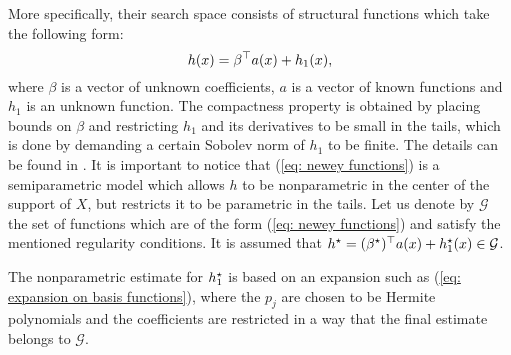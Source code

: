 More specifically, their search space consists of structural functions which take the following form:
\begin{equation}
    \label{eq: newey functions}
    h ( x ) = \beta^{ \top } a ( x ) + h_{ 1 } ( x )
,\end{equation}
where $ \beta $ is a vector of unknown coefficients, $ a $ is a vector of known functions and $ h_{ 1 } $ is an unknown function.
The compactness property is obtained by placing bounds on $ \beta $ and restricting $ h_{ 1 } $ and its derivatives to be small in the tails, which is done by demanding a certain Sobolev norm of $ h_{ 1 } $ to be finite.
The details can be found in \cite{newey2003}.
It is important to notice that (\ref{eq: newey functions}) is a semiparametric model which allows $ h $ to be nonparametric in the center of the support of $ X $, but restricts it to be parametric in the tails.
Let us denote by $ \mathcal{G} $ the set of functions which are of the form (\ref{eq: newey functions}) and satisfy the mentioned regularity conditions.
It is assumed that $ h^{ \star } = ( \beta^{ \star } ) ^{ \top } a ( x ) + h^{ \star }_{ 1 } ( x ) \in \mathcal{G} $.

The nonparametric estimate for $ h^{ \star }_{ 1 } $ is based on an expansion such as (\ref{eq: expansion on basis functions}), where the $ p_{ j } $ are chosen to be Hermite polynomials and the coefficients are restricted in a way that the final estimate belongs to $ \mathcal{G} $.

